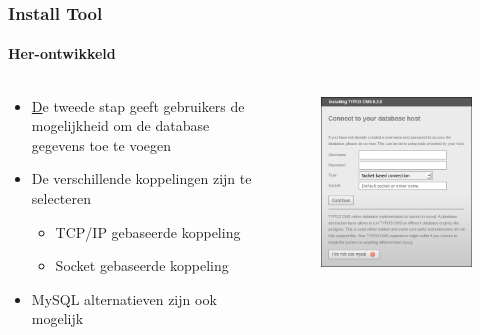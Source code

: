 \begin{frame}[fragile]
	\frametitle{Install Tool}
	\framesubtitle{Her-ontwikkeld}

	\begin{columns}[T]

		\begin{column}{.5\textwidth}
			\begin{itemize}
				\item \underline De {tweede} stap geeft gebruikers de mogelijkheid om de database gegevens toe te voegen
				\item De verschillende koppelingen zijn te selecteren
					\begin{itemize}
						\item TCP/IP gebaseerde koppeling
						\item Socket gebaseerde koppeling
					\end{itemize}
				\item MySQL alternatieven zijn ook mogelijk
			\end{itemize}
		\end{column}

		\begin{column}{.5\textwidth}
			\begin{figure}\vspace*{-0.4cm}
				\includegraphics[width=0.6\linewidth]{Images/InstallTool/DatabaseConnectionDetails.png}
			\end{figure}
		\end{column}

	\end{columns}

\end{frame}

